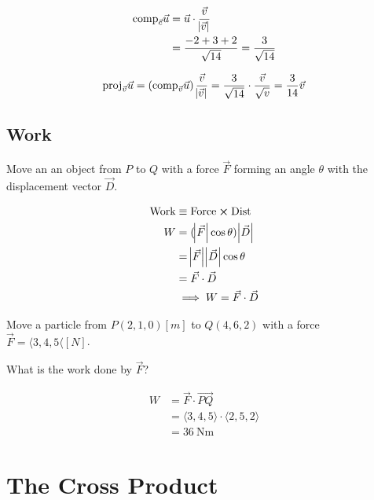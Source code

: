\begin{sol}
	\begin{align}
		\mathrm{comp}_{\vec c} \vec u &= \vec u \cdot \frac{\vec v}{\abs{\vec v}}\\
		&= \frac{-2 + 3 + 2}{\sqrt{14}} = \frac{3}{\sqrt{14}}
	\end{align}

	\begin{equation}
		\mathrm{proj}_{\vec v} \vec u = \left(\mathrm{comp}_{\vec v} \vec u\right) \frac{\vec v}{\abs{\vec v}} = \frac{3}{\sqrt{14}} \cdot \frac{\vec v}{\sqrt{v}} = \frac{3}{14} \vec v
	\end{equation}
\end{sol}

\subsection{Work}

Move an an object from $P$ to $Q$ with a force $\vec F$ forming an angle $\theta$ with the displacement vector $\vec D$.

\begin{align}
	\text{Work} &\equiv \text{Force} \cross \text{Dist}\\
	W &= (\abs{\vec F}\cos \theta) \abs{\vec D}\\
	&= \abs{\vec F}\abs{\vec D}\cos \theta\\
	&= \vec F \cdot \vec D\\
	&\implies W = \vec F \cdot \vec D
\end{align}

\begin{example}
	Move a particle from $P(2,1,0)[m]$ to $Q(4,6,2)$ with a force $\vec F = \langle 3, 4, 5 \langle [N]$.

	What is the work done by $\vec F$?
\end{example}

\begin{sol}
	\begin{align}
		W &= \vec F \cdot \vec{PQ}\\
		&= \langle 3, 4, 5 \rangle \cdot \langle 2, 5, 2\rangle\\
		&= \SI{36}{\N\m}
	\end{align}
\end{sol}

\section{The Cross Product}

